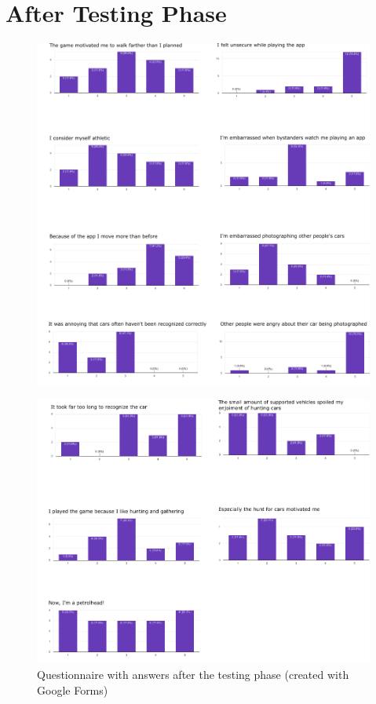 \section{After Testing Phase}
\begin{figure}[btph]
  \centering
        \includegraphics[width=.99\linewidth]{gfx/Evaluation_post1_5}
        \label{fig:evaluationPost1.5}
\end{figure}

\clearpage

\begin{figure}[btph]
  \centering
        \includegraphics[width=.99\linewidth]{gfx/Evaluation_post2}
        \caption{Questionnaire with answers after the testing phase (created with Google Forms)}
        \label{fig:evaluationPost2}
\end{figure}

